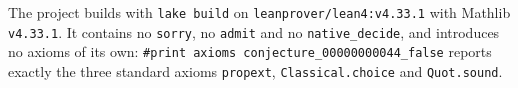 \documentclass[11pt]{article}
\theoremstyle{plain}
\theoremstyle{remark}
\begin{document}
The project builds with \texttt{lake build} on
\texttt{leanprover/lean4:v4.33.1} with Mathlib \texttt{v4.33.1}. It contains no
\texttt{sorry}, no \texttt{admit} and no \texttt{native\_decide}, and
introduces no axioms of its own:
\texttt{\#print axioms conjecture\_00000000044\_false} reports exactly the
three standard axioms \texttt{propext}, \texttt{Classical.choice} and
\texttt{Quot.sound}.
\end{document}
